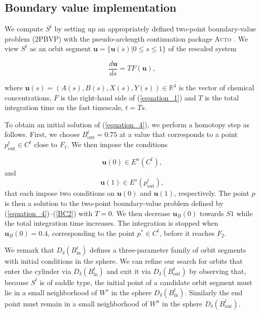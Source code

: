 \documentclass{ws-ijbc}
\begin{document}
\subsection{Boundary value implementation}
    
We compute $S^t$ by setting up an appropriately defined two-point boundary-value problem (2PBVP) with the pseudo-arclength continuation package \textsc{Auto} \cite{AUTO}.  We view $S^t$ as an orbit segment $\mathbf{u} = \{\mathbf{u}(s)| 0 \leq s \leq 1 \}$ of the rescaled system


\begin{equation}
\frac{d\mathbf{u}}{ds} = TF(\mathbf{u}),
\label{equation_4}
\end{equation}
    
\noindent
where $\mathbf{u}(s) = (A(s), B(s), X(s), Y(s)) \in \mathbb{R}^4$ is the vector of chemical concentrations, $F$ is the right-hand side of (\ref{equation_1}) and $T$ is the total integration time on the fast timescale, $t=Ts$.
    
To obtain an initial solution of (\ref{equation_4}), we perform a homotopy step as follows.  First, we choose $B^t_{\mathrm{out}} = 0.75$ at a value that corresponds to a point $p^t_{\mathrm{out}} \in C^t$ close to $F_1$.  We then impose the conditions
    
\begin{equation}
\mathbf{u}(0) \in E^u(C^t),
\label{BC3}
\end{equation}
and
\begin{equation}
\mathbf{u}(1) \in E^s(p^t_{\mathrm{out}}),
\label{BC2}
\end{equation}
\noindent
that each impose two conditions on $\mathbf{u}(0)$ and $\mathbf{u}(1)$, respectively.  The point $p$ is then a solution to the two-point boundary-value problem defined by (\ref{equation_4})--(\ref{BC2}) with $T=0$.  We then  decrease $\mathbf{u}_B(0)$ towards $S1$ while the total integration time increases.  The integration is stopped when $\mathbf{u}_B(0)=0.4$, corresponding to the point $p^* \in C^t$, before it reaches $F_2$.
    
We remark that $D_\delta(B^t_{\mathrm{in}})$ defines a three-parameter family of orbit segments with initial conditions in the sphere.  We can refine our search for orbits that enter the cylinder via $D_\delta(B^t_{\mathrm{in}})$ and exit it via $D_\delta(B^t_{\mathrm{out}})$ by observing that, because $S^t$ is of saddle type, the initial point of a candidate orbit segment must lie in a small neighborhood of $W^s$ in the sphere $D_\delta(B^t_{\mathrm{in}})$.  Similarly the end point must remain in a small neighborhood of $W^u$ in the sphere $D_\delta(B^t_{\mathrm{out}})$.
    
\end{document}
